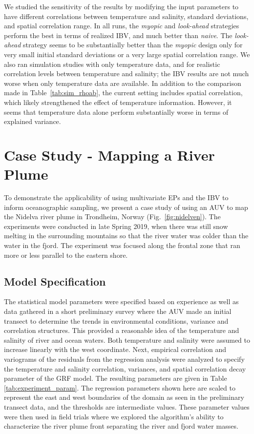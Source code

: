 \documentclass[aoas]{imsart}
\begin{document}
We studied the sensitivity of the results by modifying the input
parameters to have different correlations between temperature and
salinity, standard deviations, and spatial correlation range.  In all
runs, the \textit{myopic} and \textit{look-ahead} strategies perform
the best in terms of realized IBV, and much better than
\textit{naive}. The \textit{look-ahead} strategy seems to be
substantially better than the \textit{myopic} design only for very
small initial standard deviations or a very large spatial correlation
range. 
We also ran simulation studies with only temperature data, and for
realistic correlation levels between temperature and salinity; the IBV
results are not much worse when only temperature data are
available. In addition to the comparison made in
Table~\ref{tab:sim_rhoab}, the current setting includes spatial
correlation, which likely strengthened the effect of temperature information. However, it seems that temperature data alone
perform substantially worse in terms of explained variance.

\section{Case Study - Mapping a River Plume}
\label{sec:case_study}

To demonstrate the applicability of using multivariate EPs and the IBV
to inform oceanographic sampling, we present a case study of using an AUV to map the Nidelva river plume in Trondheim, Norway (Fig.~\ref{fig:nidelven}). The
experiments were conducted in late Spring 2019, when there was still
snow melting in the surrounding mountains so that the river water was colder than the water in the fjord. The experiment was
focused along the frontal zone that ran more or less parallel to the
eastern shore.

\subsection{Model Specification}
\label{sec:exp_modeling}

The statistical model parameters were specified based on experience as well as data gathered in a short
preliminary survey where the AUV made an initial transect to determine
the trends in environmental conditions, variance and correlation
structures. This provided a reasonable idea of the temperature and salinity of river and ocean waters. Both temperature and salinity were assumed to increase linearly with the west coordinate. Next, empirical correlation and variograms of the residuals from the regression analysis were analyzed to specify the temperature and salinity correlation, variances, and spatial correlation decay parameter of the GRF model.
The resulting
parameters are given in Table \ref{tab:experiment_param}. The
regression parameters shown here are scaled to represent the east and
west boundaries of the domain as seen in the preliminary transect
data, and the thresholds are intermediate values. These parameter
values were then used in field trials where we explored the
algorithm's ability to characterize the river plume front separating
the river and fjord water masses.
\end{document}
